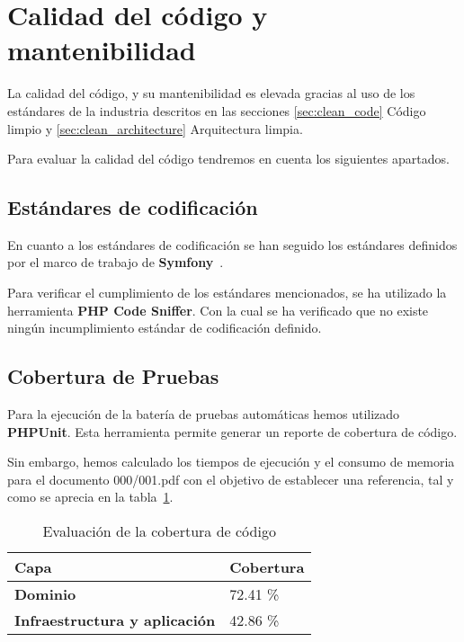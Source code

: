 \section{Calidad del código y mantenibilidad}

La calidad del código, y su mantenibilidad es elevada gracias al uso de los estándares de la industria descritos en
las secciones \ref{sec:clean_code} Código limpio y \ref{sec:clean_architecture} Arquitectura limpia.

Para evaluar la calidad del código tendremos en cuenta los siguientes apartados.

\subsection*{Estándares de codificación}

En cuanto a los estándares de codificación se han seguido los estándares definidos por el marco de trabajo de
\textbf{Symfony}~\cite{url_symfony_code_standards}.

Para verificar el cumplimiento de los estándares mencionados, se ha utilizado la herramienta
\textbf{PHP Code Sniffer}.
Con la cual se ha verificado que no existe ningún incumplimiento estándar de codificación definido.

\subsection*{Cobertura de Pruebas}

Para la ejecución de la batería de pruebas automáticas hemos utilizado \textbf{PHPUnit}.
Esta herramienta permite generar un reporte de cobertura de código.

Sin embargo, hemos calculado los tiempos de ejecución y el consumo de memoria para el documento 000/001.pdf con el
objetivo de establecer una referencia, tal y como se aprecia en la tabla~\ref{tab:phpunit_report}.

\begin{table}[h]
    \renewcommand{\arraystretch}{1.5}
    \setlength{\tabcolsep}{10pt}
    \begin{tabular}{>{\bfseries}p{} p{}}
        \toprule
        \textbf{Capa}                         & \textbf{Cobertura} \\
        \midrule
        \textbf{Dominio}                      & 72.41 \%           \\
        \textbf{Infraestructura y aplicación} & 42.86 \%           \\
        \bottomrule
    \end{tabular}
    \caption{Evaluación de la cobertura de código}
    \label{tab:phpunit_report}
\end{table}


